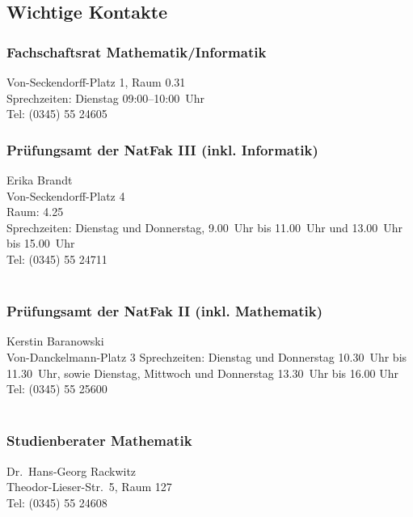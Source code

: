 \subsection{Wichtige Kontakte}

\subsubsection{Fachschaftsrat Mathematik/Informatik}
Von-Seckendorff-Platz 1, Raum 0.31\\
Sprechzeiten: Dienstag 09:00--10:00~Uhr\\
Tel: (0345) 55 24605\\

\subsubsection{Prüfungsamt der NatFak III (inkl. Informatik)}
Erika Brandt\\
Von-Seckendorff-Platz 4\\
Raum: 4.25\\
Sprechzeiten: Dienstag und Donnerstag, 9.00~Uhr bis 11.00~Uhr und
13.00~Uhr bis 15.00~Uhr\\
Tel: (0345) 55 24711\\
\\

\subsubsection{Prüfungsamt der NatFak II (inkl. Mathematik)}
Kerstin Baranowski\\
Von-Danckelmann-Platz 3
Sprechzeiten: Dienstag und Donnerstag 10.30~Uhr bis 11.30~Uhr, sowie
Dienstag, Mittwoch und Donnerstag 13.30~Uhr bis 16.00 Uhr\\
Tel: (0345) 55 25600\\
\\

\subsubsection{Studienberater Mathematik}
Dr.\ Hans-Georg Rackwitz\\
Theodor-Lieser-Str.\ 5, Raum 127\\
Tel: (0345) 55 24608\\
\\


